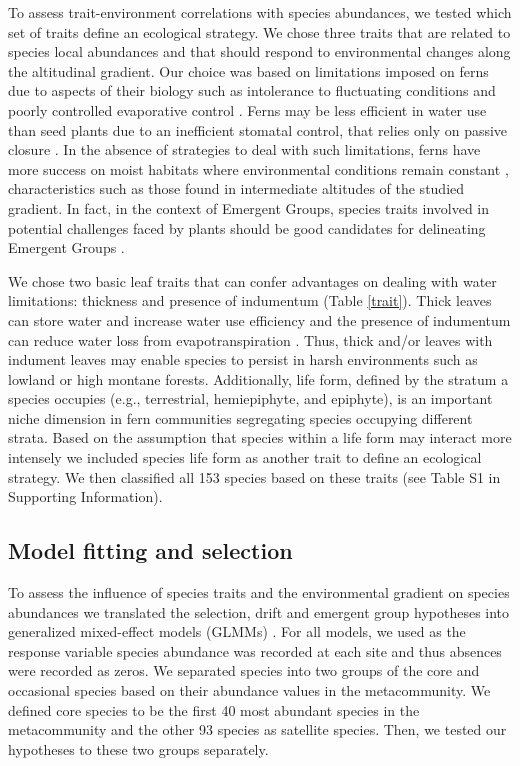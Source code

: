 \documentclass[12pt]{article}
\begin{document}
To assess trait-environment correlations with species
abundances, we tested which set of traits define an ecological
strategy. We chose three traits that are related to species local
abundances and that should respond to environmental changes along the
altitudinal gradient.  Our choice was based on limitations imposed on
ferns due to aspects of their biology such as intolerance to
fluctuating conditions and poorly controlled evaporative control
\citep{Page2002}. Ferns may be less efficient in water use than seed
plants due to an inefficient stomatal control, that relies only on
passive closure \citep{Brodribb2011}.  In the absence of strategies to
deal with such limitations, ferns have more success on moist habitats
where environmental conditions remain constant \citep{Page2002},
characteristics such as those found in intermediate altitudes of the
studied gradient.  In fact, in the context of Emergent Groups, species
traits involved in potential challenges faced by plants should be good
candidates for delineating Emergent Groups \citep{Herault2007}.

We chose two basic leaf traits that can confer advantages on dealing
with water limitations: thickness and presence of indumentum (Table
\ref{trait}). Thick leaves can store water and increase water use
efficiency and the presence of indumentum can reduce water loss from
evapotranspiration \citep{Watkins2012}. Thus, thick and/or leaves with indument
leaves may enable species to persist in harsh environments such as
lowland or high montane forests.  Additionally, life form, defined by
the stratum a species occupies (e.g., terrestrial, hemiepiphyte, and
epiphyte), is an important niche dimension in fern communities
segregating species occupying different strata.  Based on the
assumption that species within a life form may interact more intensely
we included species life form as another trait to define an ecological
strategy. We then classified all 153 species based on these traits
(see Table S1 in Supporting Information).

\subsection*{Model fitting and selection}

To assess the influence of species traits and the environmental
gradient on species abundances we translated the selection, drift and
emergent group hypotheses into generalized mixed-effect models
(GLMMs) \cite{Bolker2009}. %
For all models, we used as the response variable species
abundance was recorded at each site and thus absences were recorded as
zeros. We separated species into two groups of the core and occasional
species based on their abundance values in the metacommunity. We
defined core species to be the first 40 most abundant species in the
metacommunity and the other 93 species as satellite species.
Then, we
tested our hypotheses to these two groups separately.
\end{document}
